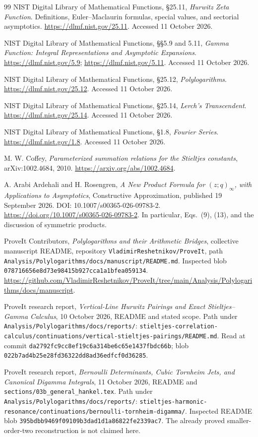 \documentclass[11pt,a4paper]{article}
\numberwithin{equation}{section}
\theoremstyle{definition}
\theoremstyle{remark}
\newcommand{\src}[1]{\nolinkurl{#1}}
\begin{document}
\begin{thebibliography}{99}
NIST Digital Library of Mathematical Functions, \S25.11,
\emph{Hurwitz Zeta Function}. Definitions, Euler--Maclaurin formulas,
special values, and sectorial asymptotics.
\url{https://dlmf.nist.gov/25.11}. Accessed 11 October 2026.

NIST Digital Library of Mathematical Functions, \S\S5.9 and 5.11,
\emph{Gamma Function: Integral Representations and Asymptotic Expansions}.
\url{https://dlmf.nist.gov/5.9}; \url{https://dlmf.nist.gov/5.11}.
Accessed 11 October 2026.

NIST Digital Library of Mathematical Functions, \S25.12,
\emph{Polylogarithms}. \url{https://dlmf.nist.gov/25.12}.
Accessed 11 October 2026.

NIST Digital Library of Mathematical Functions, \S25.14,
\emph{Lerch's Transcendent}. \url{https://dlmf.nist.gov/25.14}.
Accessed 11 October 2026.

NIST Digital Library of Mathematical Functions, \S1.8,
\emph{Fourier Series}. \url{https://dlmf.nist.gov/1.8}.
Accessed 11 October 2026.

M. W. Coffey, \emph{Parameterized summation relations for the Stieltjes
constants}, arXiv:1002.4684, 2010.
\url{https://arxiv.org/abs/1002.4684}.

A. Arabi Ardehali and H. Rosengren,
\emph{A New Product Formula for $(z;q)_\infty$, with Applications to
Asymptotics}, Constructive Approximation, published 19 September 2026.
DOI: 10.1007/s00365-026-09783-2.
\url{https://doi.org/10.1007/s00365-026-09783-2}.
In particular, Eqs.~(9), (13), and the discussion of symmetric products.

ProveIt Contributors, \emph{Polylogarithms and their Arithmetic Bridges},
collective manuscript README, repository
\src{VladimirReshetnikov/ProveIt}, path
\src{Analysis/Polylogarithms/docs/manuscript/README.md}.
Inspected blob \src{078716656e8d73e98415b927cca1a1bfea059134}.
\url{https://github.com/VladimirReshetnikov/ProveIt/tree/main/Analysis/Polylogarithms/docs/manuscript}.

ProveIt research report, \emph{Vertical-Line Hurwitz Pairings and Exact
Stieltjes--Gamma Calculus}, 10 October 2026, README and stated scope.
Path under \src{Analysis/Polylogarithms/docs/reports/}:
\src{stieltjes-correlation-calculus/continuations/vertical-stieltjes-pairings/README.md}.
Read at commit \src{da2792fc9cc8ef19c6a314be6c65e1437fbdc66b};
blob \src{022b7ad4b25e28fd36322dd8ad36edfcf0d36285}.

ProveIt research report, \emph{Bernoulli Determinants, Cubic Tornheim Jets,
and Canonical Digamma Integrals}, 11 October 2026, README and
\src{sections/03b_general_hankel.tex}.
Path under \src{Analysis/Polylogarithms/docs/reports/}:
\src{stieltjes-harmonic-resonance/continuations/bernoulli-tornheim-digamma/}.
Inspected README blob \src{395bdbb9469f09109b3dad1d1a86822fe2339ac7}.
The already proved smaller-order-two reconstruction is not claimed here.
\end{thebibliography}
\end{document}
